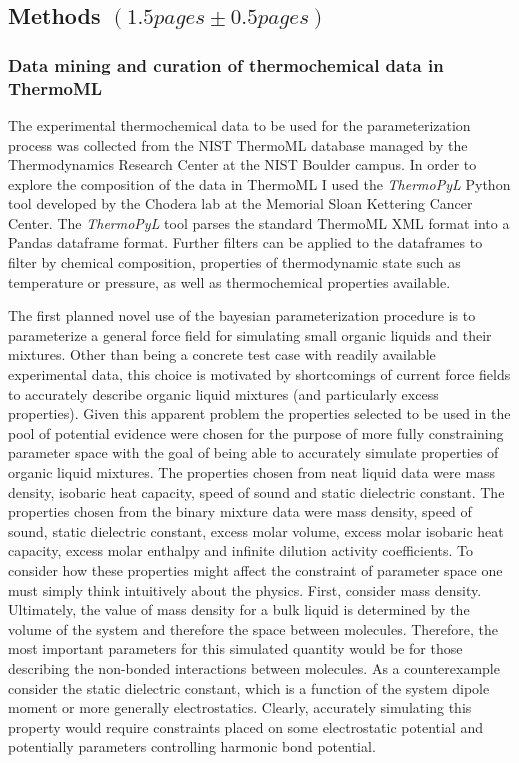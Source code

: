 \documentclass[rmp,nofootinbib,superscriptaddress,12pt,tightenlines,notitlepage]{revtex4-1}
\begin{document}
\subsection{Methods $\left(1.5 pages \pm 0.5 pages\right)$}
\subsubsection{Data mining and curation of thermochemical data in ThermoML}
The experimental thermochemical data to be used for the parameterization process was collected from the NIST ThermoML database managed by the 
Thermodynamics Research Center at the  NIST Boulder campus. In order to explore the composition of the data in ThermoML I used the \textit{ThermoPyL}
Python tool developed by the Chodera lab at the Memorial Sloan Kettering Cancer Center.\cite{thermopyl} The \textit{ThermoPyL} tool parses the
standard ThermoML XML format into a Pandas dataframe format. Further filters can be applied to the dataframes to filter by chemical composition, 
properties of thermodynamic state such as temperature or pressure, as well as thermochemical properties available.

The first planned novel use of the bayesian parameterization procedure is to parameterize a general force field for simulating small organic liquids
and their mixtures. Other than being a concrete test case with readily available experimental data, this choice is motivated by shortcomings of current
force fields to accurately describe organic liquid mixtures (and particularly excess properties).\cite{mix} Given this apparent problem the properties
selected to be used in the pool of potential evidence were chosen for the purpose of more fully constraining parameter space with the goal of being 
able to accurately simulate properties of organic liquid mixtures. The properties chosen from neat liquid data were mass density, isobaric heat capacity, 
speed of sound and static dielectric constant. The properties chosen from the binary mixture data were mass density, speed of sound, static dielectric constant, excess molar volume, excess molar isobaric heat capacity, excess molar enthalpy and infinite dilution activity coefficients. To consider how these properties
might affect the constraint of parameter space one must simply think intuitively about the physics. First, consider mass density. Ultimately, the value of mass 
density for a bulk liquid is determined by the volume of the system and therefore the space between molecules. Therefore, the most important parameters for 
this simulated quantity would be for those describing the non-bonded interactions between molecules. As a counterexample consider the static dielectric constant, 
which is a function of the system dipole moment or more generally electrostatics. Clearly, accurately simulating this property would require constraints placed 
on some electrostatic potential and potentially parameters controlling harmonic bond potential.
\end{document}
